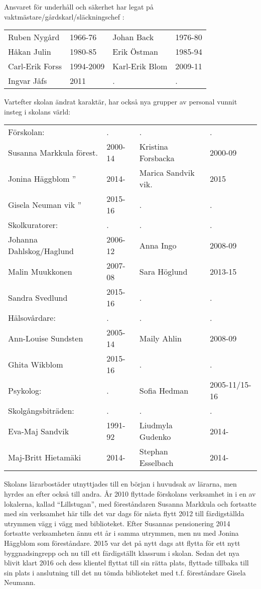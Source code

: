 Ansvaret för underhåll och säkerhet har legat på vaktmästare/gårdskarl/släckningschef :
\begin{center}
  \begin{tabular}{l l l l}
    \hline
    Ruben Nygård & 1966-76 & Johan Back & 1976-80 \\
    Håkan Julin & 1980-85 & Erik Östman & 1985-94 \\
    Carl-Erik Forss & 1994-2009 & Karl-Erik Blom & 2009-11 \\
    Ingvar Jåfs & 2011 & . & .  \\
    \hline
  \end{tabular}
\end{center}

Vartefter skolan ändrat karaktär, har också nya grupper av personal vunnit insteg i skolans värld:
\begin{center}
  \begin{tabular}{l l l l}
    \hline
    Förskolan: & . & . & . \\
    Susanna Markkula förest. & 2000-14 & Kristina Forsbacka & 2000-09 \\
    Jonina Häggblom  '' & 2014- & Marica Sandvik vik. & 2015 \\
    Gisela Neuman vik '' & 2015-16 & . & . \\
    Skolkuratorer: & . & . & . \\
    Johanna Dahlskog/Haglund & 2006-12 & Anna Ingo & 2008-09 \\
    Malin Muukkonen & 2007-08 & Sara Höglund & 2013-15 \\
    Sandra Svedlund & 2015-16 & . & . \\
    Hälsovårdare: & . & . & . \\
    Ann-Louise Sundsten & 2005-14 & Maily Ahlin & 2008-09 \\
    Ghita Wikblom & 2015-16 & . & . \\
    Psykolog: & . & Sofia Hedman & 2005-11/15-16 \\
    Skolgångsbiträden: & . & . & . \\
    Eva-Maj Sandvik & 1991-92 & Liudmyla Gudenko & 2014- \\
    Maj-Britt Hietamäki & 2014- & Stephan Esselbach & 2014- \\
    \hline
  \end{tabular}
\end{center}

Skolans lärarbostäder utnyttjades till en början i huvudsak av lärarna, men hyrdes an efter också till andra. År 2010 flyttade förskolans verksamhet in i en av lokalerna, kallad ``Lillstugan'', med föreståndaren Susanna Markkula och fortsatte med sin verksamhet här tills det var dags för nästa flytt 2012 till färdigställda utrymmen vägg i vägg med biblioteket. Efter Susannas pensionering 2014 fortsatte verksamheten ännu ett år i samma utrymmen, men nu med Jonina Häggblom som föreståndare. 2015 var det på nytt dags att flytta för ett nytt byggnadsingrepp och nu till ett färdigställt klassrum i skolan. Sedan det nya  blivit klart 2016 och dess klientel flyttat till sin rätta plats, flyttade  tillbaka till sin plats i anslutning till det nu tömda biblioteket med t.f. föreståndare  Gisela Neumann.


